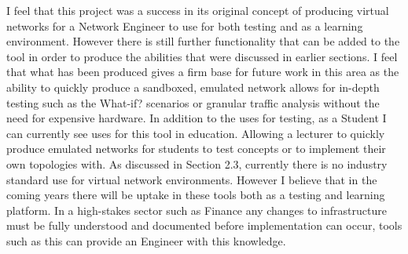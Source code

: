 \documentclass[11pt]{report}
\begin{document}
I feel that this project was a success in its original concept of producing virtual networks for a Network Engineer to use for both testing and as a learning environment. However there is still further functionality that can be added to the tool in order to produce the abilities that were discussed in earlier sections. I feel that what has been produced gives a firm base for future work in this area as the ability to quickly produce a sandboxed, emulated network allows for in-depth testing such as the What-if? scenarios or granular traffic analysis without the need for expensive hardware. In addition to the uses for testing, as a Student I can currently see uses for this tool in education. Allowing a lecturer to quickly produce emulated networks for students to test concepts or to implement their own topologies with. As discussed in Section 2.3, currently there is no industry standard use for virtual network environments. However I believe that in the coming years there will be uptake in these tools both as a testing and learning platform. In a high-stakes sector such as Finance any changes to infrastructure must be fully understood and documented before implementation can occur, tools such as this can provide an Engineer with this knowledge.



\end{document}
